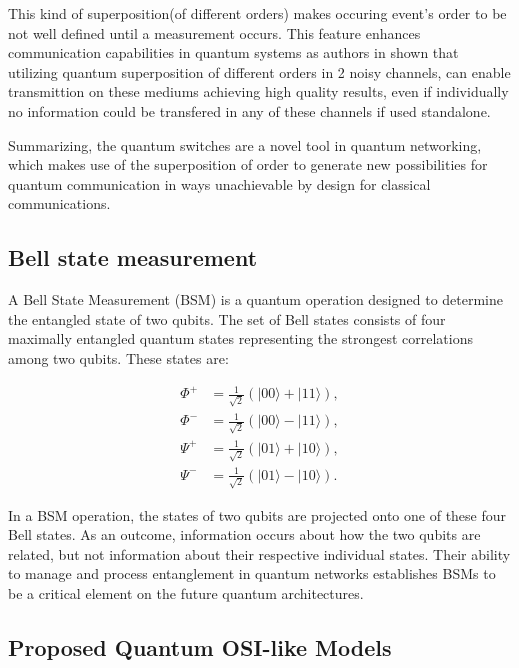 \documentclass[12pt]{ieeetj}
\begin{document}
		This kind of superposition(of different orders) makes occuring event's order to be not well defined until
		a measurement occurs. This feature enhances communication capabilities in quantum systems as authors in \cite{superposition-orders-proof}
		shown that utilizing quantum superposition of different orders in 2 noisy channels, 
		can enable transmittion on these mediums achieving high quality results,
		even if individually no information could be transfered in any of these channels if used standalone. 

		Summarizing, the quantum switches are a novel tool in quantum networking, 
		which makes use of the superposition of order to generate new possibilities for 
		quantum communication in ways unachievable by design for classical communications. 

		\subsection{Bell state measurement}

		A Bell State Measurement (BSM) is a quantum operation designed to determine
		the entangled state of two qubits. The set of Bell states consists of four 
		maximally entangled quantum states representing the strongest correlations
		among two qubits. These states are:

			\begin{align*}
			    \Phi^+ &= \frac{1}{\sqrt{2}} (|00\rangle + |11\rangle), \\
			    \Phi^- &= \frac{1}{\sqrt{2}} (|00\rangle - |11\rangle), \\
			    \Psi^+ &= \frac{1}{\sqrt{2}} (|01\rangle + |10\rangle), \\
			    \Psi^- &= \frac{1}{\sqrt{2}} (|01\rangle - |10\rangle).
			\end{align*}

		In a BSM operation, the states of two qubits are projected onto one of these four Bell states. 
		As an outcome, information occurs about how the two qubits are related, but not information
		about their respective individual states. Their ability to manage and process entanglement
		in quantum networks establishes BSMs to be a critical element on the future quantum architectures. 


		\subsection{Proposed Quantum OSI-like Models}
		
\end{document}
